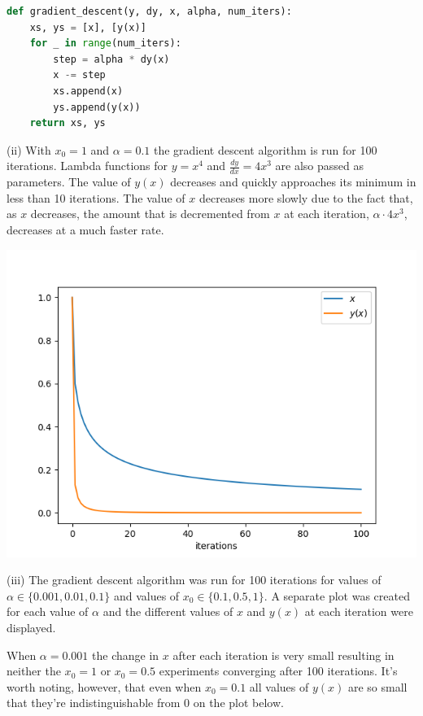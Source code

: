\documentclass[12pt]{article}
\begin{document}
\lstset{basicstyle=\footnotesize,xleftmargin=.35in}
\begin{lstlisting}[language=Python]
def gradient_descent(y, dy, x, alpha, num_iters):
    xs, ys = [x], [y(x)]
    for _ in range(num_iters):
        step = alpha * dy(x)
        x -= step
        xs.append(x)
        ys.append(y(x))
    return xs, ys
\end{lstlisting}

\noindent (ii) With $x_0=1$ and $\alpha=0.1$ the gradient descent algorithm is run for 100 iterations. Lambda functions for 
$y=x^4$ and $\frac{dy}{dx}=4x^3$ are also passed as parameters. The value of $y(x)$ decreases and quickly approaches its minimum in less than 10 iterations. The value of $x$ decreases more slowly due to the fact that, as $x$ decreases, the amount that is decremented from $x$ at each iteration, $\alpha\cdot4x^3$, decreases at a much faster rate.

\begin{center}
    \includegraphics[scale=0.55]{figs/b/b_ii.png}
\end{center}

\noindent (iii) The gradient descent algorithm was run for 100 iterations for values of $\alpha \in \{0.001, 0.01, 0.1\}$ and values of $x_0 \in \{0.1, 0.5, 1\}$. A separate plot was created for each value of $\alpha$ and the different values of $x$ and $y(x)$ at each iteration were displayed.

When $\alpha = 0.001$ the change in $x$ after each iteration is very small resulting in neither the $x_0=1$ or $x_0=0.5$ experiments converging after 100 iterations. It's worth noting, however, that even when $x_0=0.1$ all values of $y(x)$ are so small that they're indistinguishable from 0 on the plot below.
\end{document}
